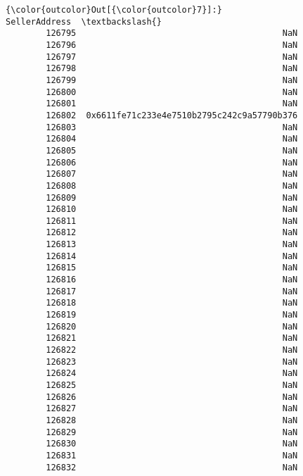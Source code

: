 \documentclass[11pt]{article}
\begin{document}
\begin{Verbatim}[commandchars=\\\{\}]
{\color{outcolor}Out[{\color{outcolor}7}]:}                                      SellerAddress  \textbackslash{}
        126795                                         NaN   
        126796                                         NaN   
        126797                                         NaN   
        126798                                         NaN   
        126799                                         NaN   
        126800                                         NaN   
        126801                                         NaN   
        126802  0x6611fe71c233e4e7510b2795c242c9a57790b376   
        126803                                         NaN   
        126804                                         NaN   
        126805                                         NaN   
        126806                                         NaN   
        126807                                         NaN   
        126808                                         NaN   
        126809                                         NaN   
        126810                                         NaN   
        126811                                         NaN   
        126812                                         NaN   
        126813                                         NaN   
        126814                                         NaN   
        126815                                         NaN   
        126816                                         NaN   
        126817                                         NaN   
        126818                                         NaN   
        126819                                         NaN   
        126820                                         NaN   
        126821                                         NaN   
        126822                                         NaN   
        126823                                         NaN   
        126824                                         NaN   
        126825                                         NaN   
        126826                                         NaN   
        126827                                         NaN   
        126828                                         NaN   
        126829                                         NaN   
        126830                                         NaN   
        126831                                         NaN   
        126832                                         NaN   
        

\end{Verbatim}
\end{document}
